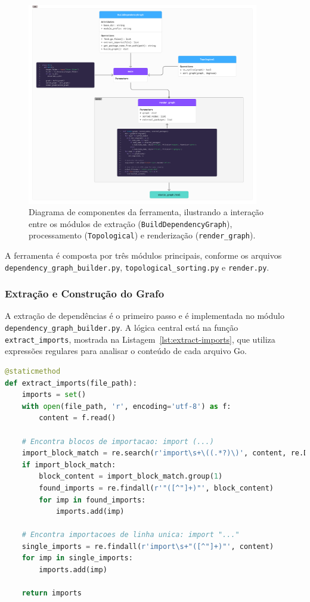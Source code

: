 \documentclass[12pt]{article}
\begin{document}
\begin{figure}[htbp]
    \centering
    \includegraphics[width=0.9\textwidth]{images/diagrama_classes.png}
    \caption{Diagrama de componentes da ferramenta, ilustrando a interação entre os módulos de extração (\texttt{BuildDependencyGraph}), processamento (\texttt{Topological}) e renderização (\texttt{render\_graph}).}
    \label{fig:diagrama-classes}
\end{figure}

A ferramenta é composta por três módulos principais, conforme os arquivos \texttt{dependency\_graph\_builder.py}, \texttt{topological\_sorting.py} e \texttt{render.py}.

\subsubsection{Extração e Construção do Grafo}
A extração de dependências é o primeiro passo e é implementada no módulo \texttt{dependency\_graph\_builder.py}. A lógica central está na função \texttt{extract\_imports}, mostrada na Listagem~\ref{lst:extract-imports}, que utiliza expressões regulares para analisar o conteúdo de cada arquivo Go.

\begin{lstlisting}[language=Python, caption={Trecho do código de extração de importações.}, label={lst:extract-imports}]
@staticmethod
def extract_imports(file_path):
    imports = set()
    with open(file_path, 'r', encoding='utf-8') as f:
        content = f.read()

    # Encontra blocos de importacao: import (...)
    import_block_match = re.search(r'import\s+\((.*?)\)', content, re.DOTALL)
    if import_block_match:
        block_content = import_block_match.group(1)
        found_imports = re.findall(r'"([^"]+)"', block_content)
        for imp in found_imports:
            imports.add(imp)

    # Encontra importacoes de linha unica: import "..."
    single_imports = re.findall(r'import\s+"([^"]+)"', content)
    for imp in single_imports:
        imports.add(imp)

    return imports
\end{lstlisting}
\end{document}
